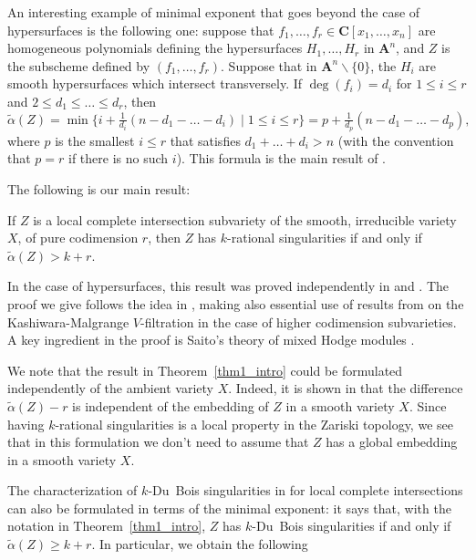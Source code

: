 An interesting example of minimal exponent that goes beyond the case of hypersurfaces is the following one: suppose that $f_1,\ldots,f_r\in {\mathbf C}[x_1,\ldots,x_n]$
are homogeneous polynomials defining the hypersurfaces $H_1,\ldots,H_r$ in ${\mathbf A}^n$, and $Z$ is the subscheme defined by $(f_1,\ldots,f_r)$.
Suppose that in ${\mathbf A}^n\smallsetminus\{0\}$, the $H_i$ are smooth hypersurfaces which
intersect transversely. If $\deg(f_i)=d_i$ for $1\leq i\leq r$ and $2\leq d_1\leq\ldots\leq d_r$, then
\[\widetilde{\alpha}(Z)=\min\big\{i+\tfrac{1}{d_i}(n-d_1-\ldots-d_i)\mid 1\leq i\leq r\big\}=p+\tfrac{1}{d_p}(n-d_1-\ldots-d_p),\]
where $p$ is the smallest $i\leq r$ that satisfies $d_1+\ldots+d_i>n$ (with the convention that $p=r$ if there is no such $i$). This formula is the main result of \cite{CDM}.

The following is our main result:

\begin{thm}\label{thm1_intro}
If $Z$ is a local complete intersection subvariety of the smooth, irreducible variety $X$, of pure codimension $r$, then $Z$ has $k$-rational singularities
if and only if $\widetilde{\alpha}(Z)>k+r$.
\end{thm}

In the case of hypersurfaces, this result was proved independently in \cite[App.]{FL2} and \cite{MP2}. The proof we give follows the idea in \cite[App.]{FL2},
making also essential use of results from \cite{CD} on the Kashiwara-Malgrange $V$-filtration in the case of higher codimension subvarieties. A key ingredient
in the proof is Saito's theory of mixed Hodge modules \cite{Saito_MHM}.

We note that the result in Theorem~\ref{thm1_intro} could be formulated independently of the ambient variety $X$. Indeed, it is shown in \cite[Prop.\,4.14]{CDMO}
that the difference $\widetilde{\alpha}(Z)-r$ is independent of the embedding of $Z$ in a smooth variety $X$. Since having $k$-rational singularities is a local property in the Zariski topology,
we see that in this formulation we don't need to assume that $Z$ has a global embedding in a smooth variety $X$.

The characterization of $k$-Du~Bois singularities in \cite{MP1} for local complete intersections can also be formulated in terms of the minimal exponent:
it says that, with the notation in Theorem~\ref{thm1_intro}, $Z$ has $k$-Du~Bois singularities if and only if $\widetilde{\alpha}(Z)\geq k+r$. In particular, we obtain the following


